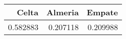 \begin{tabular}{rrr}
\hline
    Celta &   Almeria &   Empate \\
\hline
 0.582883 &  0.207118 & 0.209988 \\
\hline
\end{tabular}